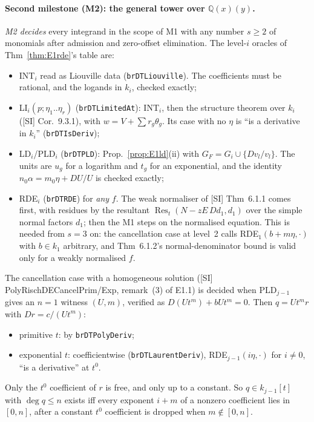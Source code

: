 \documentclass[11pt]{article}
\theoremstyle{definition}
\theoremstyle{remark}
\newcommand{\Q}{\mathbb{Q}}
\newcommand{\code}[1]{\texttt{#1}}
\begin{document}
\paragraph{Second milestone (M2): the general tower over $\Q(x)(y)$.}
\emph{M2 decides} every integrand in the scope of M1 with any number $s\ge2$ of monomials
after admission and zero-offset elimination. The level-$i$ oracles of Thm~\ref{thm:E1rde}'s
table are:
\begin{itemize}
\item INT$_i$ read as Liouville data (\code{brDTLiouville}). The coefficients must be rational,
  and the logands in $k_i$, checked exactly;
\item LI$_i(p;\eta_1..\eta_r)$ (\code{brDTLimitedAt}): INT$_i$, then the structure theorem over
  $k_i$ ([SI] Cor.~9.3.1), with $w=V+\sum r_g\theta_g$. Its case with no $\eta$ is ``is a
  derivative in $k_i$'' (\code{brDTIsDeriv});
\item LD$_i$/PLD$_i$ (\code{brDTPLD}): Prop.~\ref{prop:E1ld}(ii) with
  $G_F=G_i\cup\{Dv_l/v_l\}$. The units are $u_g$ for a logarithm and $t_g$ for an exponential, and the
  identity $n_0\alpha=m_0\eta+DU/U$ is checked exactly;
\item RDE$_i$ (\code{brDTRDE}) for \emph{any} $f$. The weak normaliser of [SI] Thm~6.1.1 comes
  first, with residues by the resultant $\operatorname{Res}_t(N-zE\,Dd_1,d_1)$ over the simple
  normal factors $d_1$; then the M1 steps on the normalised equation. This is needed from
  $s=3$ on: the cancellation case at level~2 calls RDE$_1(b+m\eta,\cdot)$ with $b\in k_1$
  arbitrary, and Thm~6.1.2's normal-denominator bound is valid only for a weakly normalised
  $f$.
\end{itemize}
The cancellation case with a homogeneous solution ([SI] PolyRischDECancelPrim/Exp, remark~(3)
of E1.1) is decided when PLD$_{j-1}$ gives an $n=1$ witness $(U,m)$, verified as
$D(Ut^m)+bUt^m=0$. Then $q=Ut^m r$ with $Dr=c/(Ut^m)$:
\begin{itemize}
\item primitive $t$: by \code{brDTPolyDeriv};
\item exponential $t$: coefficientwise (\code{brDTLaurentDeriv}), RDE$_{j-1}(i\eta,\cdot)$ for
  $i\ne0$, ``is a derivative'' at $t^0$.
\end{itemize}
Only the $t^0$ coefficient of $r$ is free, and only up to a constant. So $q\in k_{j-1}[t]$ with
$\deg q\le n$ exists iff every exponent $i+m$ of a nonzero coefficient lies in $[0,n]$, after a
constant $t^0$ coefficient is dropped when $m\notin[0,n]$.
\end{document}
